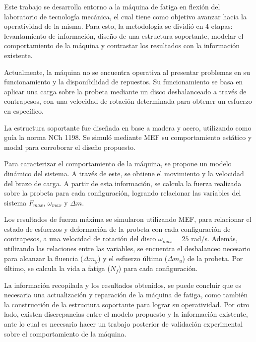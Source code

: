 
Este trabajo se desarrolla entorno a la máquina de fatiga en flexión del laboratorio de tecnología mecánica, el cual tiene como objetivo avanzar hacia la operatividad de la misma. Para esto, la metodología se dividió en 4 etapas: levantamiento de información, diseño de una estructura soportante, modelar el comportamiento de la máquina y contrastar los resultados con la información existente.

Actualmente, la máquina no se encuentra operativa al presentar problemas en su funcionamiento y la disponibilidad de repuestos. Su funcionamiento se basa en aplicar una carga sobre la probeta mediante un disco desbalanceado a través de contrapesos, con una velocidad de rotación determinada para obtener un esfuerzo en específico.

La estructura soportante fue diseñada en base a madera y acero, utilizando como guía la norma NCh 1198. Se simuló mediante MEF su comportamiento estático y modal para corroborar el diseño propuesto.

Para caracterizar el comportamiento de la máquina, se propone un modelo dinámico del sistema. A través de este, se obtiene el movimiento y la velocidad del brazo de carga. A partir de esta información, se calcula la fuerza realizada sobre la probeta para cada configuración, logrando relacionar las variables del sistema $F_{max}$, $\omega_{max}$ y $\Delta m$. 

Los resultados de fuerza máxima se simularon utilizando MEF, para relacionar el estado de esfuerzos y deformación de la probeta con cada configuración de contrapesos, a una velocidad de rotación del disco $\omega_{max}=25$ rad/s. Además, utilizando las relaciones entre las variables, se encuentra el desbalanceo necesario para alcanzar la fluencia ($\Delta m_y$) y el esfuerzo último ($\Delta m_u$) de la probeta. Por último, se calcula la vida a fatiga ($N_f$) para cada configuración.

La información recopilada y los resultados obtenidos, se puede concluir que es necesaria una actualización y reparación de la máquina de fatiga, como también la construcción de la estructura soportante para lograr su operatividad. Por otro lado, existen discrepancias entre el modelo propuesto y la información existente, ante lo cual es necesario hacer un trabajo posterior de validación experimental sobre el comportamiento de la máquina.



